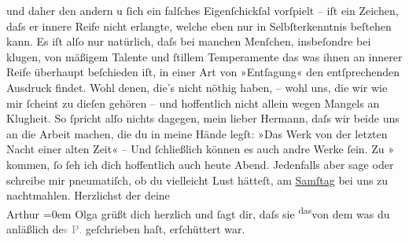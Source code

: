 \begin{ledgroupsized}[t]{13cm}
               und daher den andern u ſich ein \introOben{}falſches\introOben{} Eigenſchickſal
               vorſpielt – iſt ein Zeichen, daſs er innere Reife nicht erlangte, welche eben nur in
               Selbſterkenntnis beſtehen kann.  Es iſt {\pb}alſo nur natürlich,
               daſs bei manchen Menſchen, insbeſondre bei klugen, von mäßigem Talente und ſtillem
               Temperamente das was ihnen an innerer Reife überhaupt beſchieden iſt, in einer Art
               von »Entſagung« den entſprechenden Ausdruck findet.\pend
           \pstart
           Wohl denen, die’s nicht nöthig haben, – wohl uns, die wir wie mir ſcheint zu dieſen
               gehören – und hoffentlich nicht allein wegen Mangels an Klugheit. So ſpricht alſo
               nichts dagegen, mein lieber Hermann, daſs wir beide uns an die Arbeit machen, die du
               in meine {\pb}Hände legſt:
                  »\label{LL075-1v}Das Werk von der letzten Nacht einer alten
                  Zeit\label{LL075-1h}« – Und ſchließlich können es auch andre Werke ſein.\pend
           \pstart
           Zu »\label{K_L01477_3v}\label{K_L01477_3h}{ }kommen, ſo ſeh ich dich hoffentlich auch heute Abend.\pend
           \pstart
           Jedenfalls aber sage oder schreibe mir pneumatiſch, ob du vielleicht Lust hätteſt, am
                  \uline{Samſtag} bei uns zu nachtmahlen.\pend
           \pstart
           Herzlichst der deine{\\[\baselineskip]}\spacefill\mbox{Arthur{\pb}}\pend
           \leftskip=0em{}\pstart
           \noindent{}Olga grüßt dich herzlich und ſagt dir, daſs sie \substVorne{}\textsuperscript{das}\substDazwischen{}von dem\substHinten{} was du anläßlich de\textcolor{gray}{s \textsc{P}.}
                  geſchrieben haſt, erſchüttert war.\pend
           \endnumbering{}\end{ledgroupsized}  \newcommand{\dateiname}{L01477}\newcommand{\titel}{Arthur Schnitzler an Hermann Bahr, 14. 12. 1904}\newcommand{\editorInnen}{ Kurt Ifkovits,  Martin Anton Müller}
      